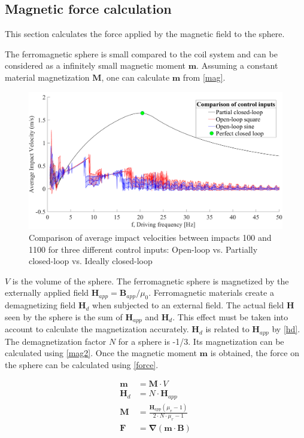 \documentclass[letterpaper, 10 pt, conference]{ieeeconf}  %
\begin{document}
\subsection{Magnetic force calculation}
\label{magforce}

This section calculates the force applied by the magnetic field to the sphere.\par
The ferromagnetic sphere is small compared to the coil system and can be considered as a infinitely small magnetic moment $\mathbf{m}$. Assuming a constant material magnetization $\mathbf{M}$, one can calculate $\mathbf{m}$ from \cref{mag}.

\begin{figure}
	\includegraphics[width=\linewidth]{ComparisonOfControlInputs.pdf}
	\caption[Comparison of impact velocities from three control inputs]{Comparison of average impact velocities between impacts 100 and 1100 for three different control inputs: Open-loop vs. Partially closed-loop vs. Ideally closed-loop}
	\label{CLvsOL}
\end{figure}

 $V$ is the volume of the sphere.
The ferromagnetic sphere is magnetized by the externally applied field $\mathbf{H}_{app}=\mathbf{B}_{app}/\mu_0$. Ferromagnetic materials create a demagnetizing field $\mathbf{H}_d$ when subjected to an external field. The actual field $\mathbf{H}$ seen by the sphere is the sum of $\mathbf{H}_{app}$ and $\mathbf{H}_d$. This effect must be taken into account to calculate the magnetization accurately. $\mathbf{H}_d$ is related to $\mathbf{H}_{app}$ by \cref{hd}. The demagnetization factor $N$ for a sphere is -1/3. Its magnetization can be calculated using \cref{mag2}.
Once the magnetic moment $\mathbf{m}$ is obtained, the force on the sphere can be calculated using \cref{force}.

\begin{align}
\mathbf{m}&=\mathbf{M}\cdot V \label{mag}\\
\mathbf{H}_d&=N\cdot \mathbf{H}_{app}\label{hd}\\
\mathbf{M}&=\frac{\mathbf{H}_{app}\left ( \mu_r-1  \right )}{2\cdot N\cdot \mu_r-1} \label{mag2}\\
\mathbf{F}&=\mathbf{\nabla}(\mathbf{m}\cdot \mathbf{B}) \label{force}
\end{align}
\end{document}
